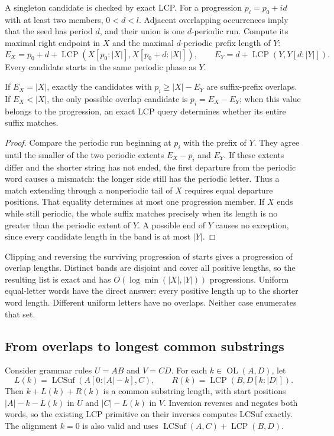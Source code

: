 A singleton candidate is checked by exact LCP. For a progression
$p_i=p_0+id$ with at least two members, $0<d<l$. Adjacent overlapping
occurrences imply that the seed has period $d$, and their union is one
$d$-periodic run. Compute its maximal right endpoint in $X$ and the maximal
$d$-periodic prefix length of $Y$:
\[
 E_X=p_0+d+\operatorname{LCP}(X[p_0:|X|],X[p_0+d:|X|]),
 \qquad
 E_Y=d+\operatorname{LCP}(Y,Y[d:|Y|]).
\]
Every candidate starts in the same periodic phase as $Y$.

\begin{lemma}
If $E_X=|X|$, exactly the candidates with $p_i\ge |X|-E_Y$ are
suffix-prefix overlaps. If $E_X<|X|$, the only possible overlap candidate
is $p_i=E_X-E_Y$; when this value belongs to the progression, an exact
LCP query determines whether its entire suffix matches.
\end{lemma}
\begin{proof}
Compare the periodic run beginning at $p_i$ with the prefix of $Y$.
They agree until the smaller of the two periodic extents
$E_X-p_i$ and $E_Y$. If these extents differ and the shorter string has
not ended, the first departure from the periodic word causes a mismatch:
the longer side still has the periodic letter. Thus a match extending
through a nonperiodic tail of $X$ requires equal departure positions.
That equality determines at most one progression member. If $X$ ends
while still periodic, the whole suffix matches precisely when its length
is no greater than the periodic extent of $Y$. A possible end of $Y$
causes no exception, since every candidate length in the band is at most
$|Y|$.
\end{proof}

Clipping and reversing the surviving progression of starts gives a
progression of overlap lengths. Distinct bands are disjoint and cover
all positive lengths, so the resulting list is exact and has
$O(\log\min(|X|,|Y|))$ progressions. Uniform equal-letter words have the
direct answer: every positive length up to the shorter word length.
Different uniform letters have no overlaps. Neither case enumerates that set.

\subsection{From overlaps to longest common substrings}

Consider grammar rules $U=AB$ and $V=CD$. For each
$k\in\operatorname{OL}(A,D)$, let
\[
 L(k)=\operatorname{LCSuf}(A[0:|A|-k],C),\qquad
 R(k)=\operatorname{LCP}(B,D[k:|D|]).
\]
Then $k+L(k)+R(k)$ is a common substring length, with start positions
$|A|-k-L(k)$ in $U$ and $|C|-L(k)$ in $V$. Inversion reverses and
negates both words, so the existing LCP primitive on their inverses
computes LCSuf exactly. The alignment $k=0$ is also valid and uses
$\operatorname{LCSuf}(A,C)+\operatorname{LCP}(B,D)$.

